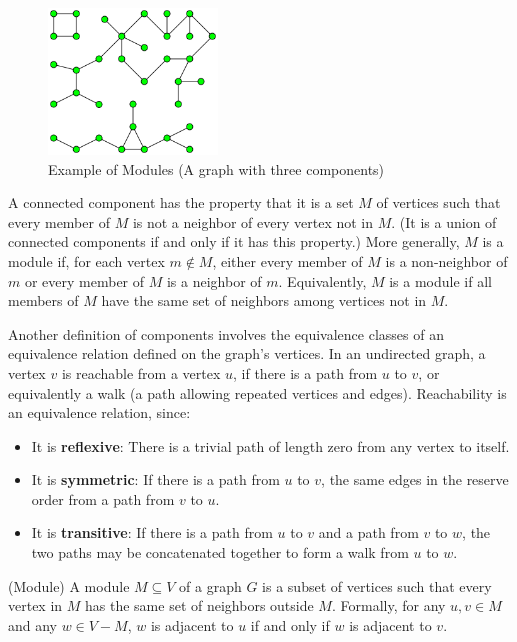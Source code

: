 \begin{figure}[!h]
    \centering
    \includegraphics[width=0.40\textwidth]{images/graphs/Pseudoforest}
    \caption{Example of Modules (A graph with three components) \cite{componentwikipedia}}
    \label{fig:example-modules}
\end{figure}

A connected component has the property that it is a set $M$ of vertices such that every member of $M$ is not a neighbor of every vertex not in $M$.
(It is a union of connected components if and only if it has this property.)
More generally, $M$ is a module if, for each vertex $m \notin M$, either every member of $M$ is a non-neighbor of $m$ or every member of $M$ is a neighbor of $m$.
Equivalently, $M$ is a module if all members of $M$ have the same set of neighbors among vertices not in $M$.

Another definition of components involves the equivalence classes of an equivalence relation defined on the graph's vertices.
In an undirected graph, a vertex $v$ is reachable from a vertex $u$, if there is a path from $u$ to $v$, or equivalently a walk (a path allowing repeated vertices and edges).
Reachability is an equivalence relation, since:
\begin{itemize}
    \item It is \textbf{reflexive}: There is a trivial path of length zero from any vertex to itself.
    \item It is \textbf{symmetric}: If there is a path from $u$ to $v$, the same edges in the reserve order from a path from $v$ to $u$.
    \item It is \textbf{transitive}: If there is a path from $u$ to $v$ and a path from $v$ to $w$, the two paths may be concatenated together to form a walk from $u$ to $w$.
\end{itemize}

\begin{mydef}
(Module)
    A module $M \subseteq V$ of a graph $G$ is a subset of vertices such that every vertex in $M$ has the same set of neighbors outside $M$.
    Formally, for any $u, v \in M$ and any $w \in V - M$, $w$ is adjacent to $u$ if and only if $w$ is adjacent to $v$.
\end{mydef}

